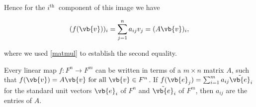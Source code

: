 \documentclass[a4paper,12pt]{report}
\begin{document}
Hence for the \(i^{\text{th }} \) component of this image we have

\begin{equation}
    (f(\vb{v} ))_{i} = \sum_{j=1}^{n} a_{ij} v_{j} = (A\vb{v} )_{i},  
\end{equation}

where we used \cref{matmul} to establish the second equality.

\begin{lemma}\label{matrixlinearmap} 
Every linear map \(f: F^{n} \rightarrow F^{m}  \) can be written in terms of a \(m \times  n\) matrix \(A\), such that \(f(\vb{v} ) = A\vb{v} \text{ for all } \vb{v} \in F^{n} \). If \(f(\vb{e} _{j} ) = \sum_{i=1}^{m} a_{ij} \tilde{\vb{e} } _{i} \) for the standard unit vectors \(\vb{e} _{i} \) of \(F^{n} \) and \(\tilde{\vb{e} } _{i} \) of \(F^{m} \), then \(a_{ij} \) are the entries of \(A\).         
\end{lemma}
\end{document}
